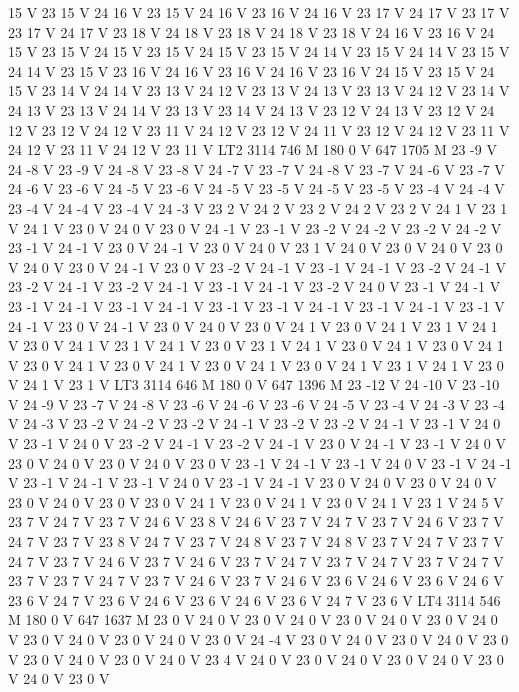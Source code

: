 15 V 23 15 V 24 16 V 23 15 V 24 16 V 23 16 V 24 16 V 23 17 V 24 17
V 23 17 V 23 17 V 24 17 V 23 18 V 24 18 V 23 18 V 24 18 V 23 18 V 24
16 V 23 16 V 24 15 V 23 15 V 24 15 V 23 15 V 24 15 V 23 15 V 24 14
V 23 15 V 24 14 V 23 15 V 24 14 V 23 15 V 23 16 V 24 16 V 23 16 V 24
16 V 23 16 V 24 15 V 23 15 V 24 15 V 23 14 V 24 14 V 23 13 V 24 12
V 23 13 V 24 13 V 23 13 V 24 12 V 23 14 V 24 13 V 23 13 V 24 14 V 23
13 V 23 14 V 24 13 V 23 12 V 24 13 V 23 12 V 24 12 V 23 12 V 24 12
V 23 11 V 24 12 V 23 12 V 24 11 V 23 12 V 24 12 V 23 11 V 24 12 V 23
11 V 24 12 V 23 11 V LT2 3114 746 M 180 0 V 647 1705 M 23 -9 V 24 -8
V 23 -9 V 24 -8 V 23 -8 V 24 -7 V 23 -7 V 24 -8 V 23 -7 V 24 -6 V 23
-7 V 24 -6 V 23 -6 V 24 -5 V 23 -6 V 24 -5 V 23 -5 V 24 -5 V 23 -5
V 23 -4 V 24 -4 V 23 -4 V 24 -4 V 23 -4 V 24 -3 V 23 2 V 24 2 V 23
2 V 24 2 V 23 2 V 24 1 V 23 1 V 24 1 V 23 0 V 24 0 V 23 0 V 24 -1 V
23 -1 V 23 -2 V 24 -2 V 23 -2 V 24 -2 V 23 -1 V 24 -1 V 23 0 V 24 -1
V 23 0 V 24 0 V 23 1 V 24 0 V 23 0 V 24 0 V 23 0 V 24 0 V 23 0 V 24
-1 V 23 0 V 23 -2 V 24 -1 V 23 -1 V 24 -1 V 23 -2 V 24 -1 V 23 -2 V
24 -1 V 23 -2 V 24 -1 V 23 -1 V 24 -1 V 23 -2 V 24 0 V 23 -1 V 24 -1
V 23 -1 V 24 -1 V 23 -1 V 24 -1 V 23 -1 V 23 -1 V 24 -1 V 23 -1 V 24
-1 V 23 -1 V 24 -1 V 23 0 V 24 -1 V 23 0 V 24 0 V 23 0 V 24 1 V 23
0 V 24 1 V 23 1 V 24 1 V 23 0 V 24 1 V 23 1 V 24 1 V 23 0 V 23 1 V
24 1 V 23 0 V 24 1 V 23 0 V 24 1 V 23 0 V 24 1 V 23 0 V 24 1 V 23 0
V 24 1 V 23 0 V 24 1 V 23 1 V 24 1 V 23 0 V 24 1 V 23 1 V LT3 3114
646 M 180 0 V 647 1396 M 23 -12 V 24 -10 V 23 -10 V 24 -9 V 23 -7 V
24 -8 V 23 -6 V 24 -6 V 23 -6 V 24 -5 V 23 -4 V 24 -3 V 23 -4 V 24
-3 V 23 -2 V 24 -2 V 23 -2 V 24 -1 V 23 -2 V 23 -2 V 24 -1 V 23 -1
V 24 0 V 23 -1 V 24 0 V 23 -2 V 24 -1 V 23 -2 V 24 -1 V 23 0 V 24 -1
V 23 -1 V 24 0 V 23 0 V 24 0 V 23 0 V 24 0 V 23 0 V 23 -1 V 24 -1 V
23 -1 V 24 0 V 23 -1 V 24 -1 V 23 -1 V 24 -1 V 23 -1 V 24 0 V 23 -1
V 24 -1 V 23 0 V 24 0 V 23 0 V 24 0 V 23 0 V 24 0 V 23 0 V 23 0 V 24
1 V 23 0 V 24 1 V 23 0 V 24 1 V 23 1 V 24 5 V 23 7 V 24 7 V 23 7 V
24 6 V 23 8 V 24 6 V 23 7 V 24 7 V 23 7 V 24 6 V 23 7 V 24 7 V 23 7
V 23 8 V 24 7 V 23 7 V 24 8 V 23 7 V 24 8 V 23 7 V 24 7 V 23 7 V 24
7 V 23 7 V 24 6 V 23 7 V 24 6 V 23 7 V 24 7 V 23 7 V 24 7 V 23 7 V
24 7 V 23 7 V 23 7 V 24 7 V 23 7 V 24 6 V 23 7 V 24 6 V 23 6 V 24 6
V 23 6 V 24 6 V 23 6 V 24 7 V 23 6 V 24 6 V 23 6 V 24 6 V 23 6 V 24
7 V 23 6 V LT4 3114 546 M 180 0 V 647 1637 M 23 0 V 24 0 V 23 0 V 24
0 V 23 0 V 24 0 V 23 0 V 24 0 V 23 0 V 24 0 V 23 0 V 24 0 V 23 0 V
24 -4 V 23 0 V 24 0 V 23 0 V 24 0 V 23 0 V 23 0 V 24 0 V 23 0 V 24
0 V 23 4 V 24 0 V 23 0 V 24 0 V 23 0 V 24 0 V 23 0 V 24 0 V 23 0 V
